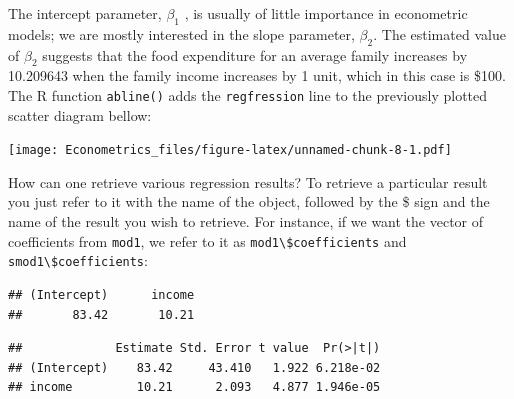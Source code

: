 \documentclass[
]{book}
\newenvironment{Shaded}{\begin{snugshade}}{\end{snugshade}}
\newcommand{\AttributeTok}[1]{\textcolor[rgb]{0.13,0.29,0.53}{#1}}
\newcommand{\FunctionTok}[1]{\textcolor[rgb]{0.13,0.29,0.53}{\textbf{#1}}}
\newcommand{\NormalTok}[1]{#1}
\newcommand{\SpecialCharTok}[1]{\textcolor[rgb]{0.81,0.36,0.00}{\textbf{#1}}}
\newcommand{\StringTok}[1]{\textcolor[rgb]{0.31,0.60,0.02}{#1}}
\begin{document}
The intercept parameter, \(\beta_1\) , is usually of little importance in econometric models; we are mostly interested in the slope parameter, \(\beta_2\). The estimated value of \(\beta_2\) suggests that the food expenditure for an average family increases by 10.209643 when the family income increases by 1 unit, which in this case is \$100. The R function \texttt{abline()} adds the \texttt{regfression} line to the previously plotted scatter diagram bellow:

\begin{Shaded}
\end{Shaded}

\texttt{[image: Econometrics\_files/figure-latex/unnamed-chunk-8-1.pdf]}

How can one retrieve various regression results? To retrieve a particular result you just refer to it with the name of the object, followed by the \$ sign and the name of the result you wish to retrieve. For instance, if we want the vector of coefficients from \texttt{mod1}, we refer to it as \texttt{mod1\textbackslash{}\$coefficients} and \texttt{smod1\textbackslash{}\$coefficients}:

\begin{Shaded}
\end{Shaded}

\begin{verbatim}
## (Intercept)      income 
##       83.42       10.21
\end{verbatim}

\begin{Shaded}
\end{Shaded}

\begin{verbatim}
##             Estimate Std. Error t value  Pr(>|t|)
## (Intercept)    83.42     43.410   1.922 6.218e-02
## income         10.21      2.093   4.877 1.946e-05
\end{verbatim}
\end{document}
